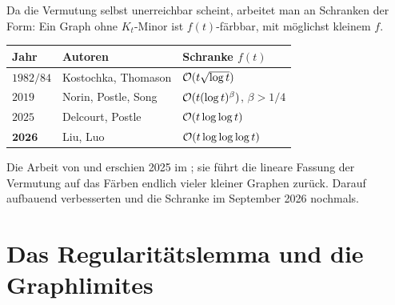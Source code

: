 \begin{forschung}
Da die Vermutung selbst unerreichbar scheint, arbeitet man an Schranken der Form: Ein Graph ohne $K_t$-Minor ist $f(t)$-färbbar, mit möglichst kleinem $f$.

\begin{center}
{\small
\renewcommand{\arraystretch}{1.45}
\begin{tabular}{@{}P{1.8cm}P{2.6cm}P{3.0cm}@{}}
\toprule
\textbf{Jahr} & \textbf{Autoren} & \textbf{Schranke $f(t)$}\\
\midrule
$1982/84$ & Kostochka, Thomason & $\mathcal{O}(t\sqrt{\log t})$\\
$2019$ & Norin, Postle, Song & $\mathcal{O}(t(\log t)^{\beta})$, $\beta > 1/4$\\
$2025$ & Delcourt, Postle & $\mathcal{O}(t \log\log t)$\\
$\mathbf{2026}$ & Liu, Luo & $\mathcal{O}(t \log\log\log t)$\\
\bottomrule
\end{tabular}}
\end{center}

Die Arbeit von  und  erschien 2025 im ; sie führt die lineare Fassung der Vermutung auf das Färben endlich vieler kleiner Graphen zurück. Darauf aufbauend verbesserten  und  die Schranke im September 2026 nochmals.

\begin{center}
\begin{minipage}{0.88\textwidth}
\end{minipage}
\end{center}
\end{forschung}

\section{Das Regularitätslemma und die Graphlimites}

